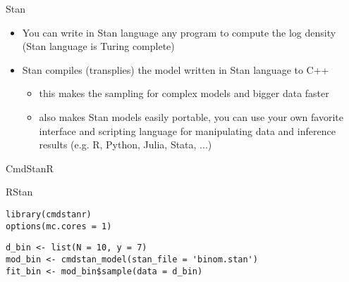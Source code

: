 \documentclass[finnish,english,t]{beamer}
\begin{document}

  



    

\begin{frame}{Stan}
  
  \begin{itemize}
  \item You can write in Stan language any program to compute the
    log density (Stan language is Turing complete)
  \item<2-> Stan compiles (transplies) the model written in Stan language to C++
    \begin{itemize}
    \item this makes the sampling for complex models and bigger data faster
    \item also makes Stan models easily portable, you can use your own
      favorite interface and scripting language for manipulating data
      and inference results (e.g. R, Python, Julia, Stata, ...)
    \end{itemize}
  \end{itemize}

\end{frame}

\begin{frame}[fragile]{CmdStanR}

  {\small
    {
      RStan
\begin{verbatim}
library(cmdstanr) 
options(mc.cores = 1)
\end{verbatim}
    }
{
\begin{verbatim}
d_bin <- list(N = 10, y = 7)
mod_bin <- cmdstan_model(stan_file = 'binom.stan')
fit_bin <- mod_bin$sample(data = d_bin)
\end{verbatim}
}
}
\end{frame}
\end{document}
